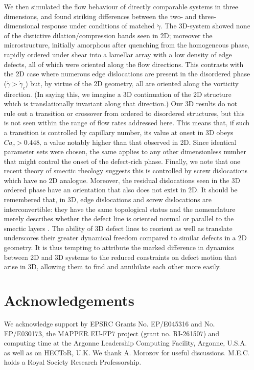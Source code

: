 \documentclass[8.5pt,twoside,twocolumn]{article}
\begin{document}
We then simulated the flow behaviour of directly comparable systems in three dimensions, and found striking differences between the two- and three-dimensional response under conditions of matched $\dot\gamma$. The 3D-system showed none of the distictive dilation/compression bands seen in 2D; moreover the microstructure, initially amorphous after quenching from the homogeneous phase, rapidly ordered under shear into a lamellar array with a low density of edge defects, all of which were oriented along the flow directions. This contrasts with the 2D case where numerous edge dislocations are present in the disordered phase ($\dot\gamma > \dot\gamma_c$) but, by virtue of the 2D geometry, all are oriented along the vorticity direction. (In saying this, we imagine a 3D continuation of the 2D structure which is translationally invariant along that direction.) Our 3D results do not rule out a transition or crossover from ordered to disordered structures, but this is not seen within the range of flow rates addressed here. This means that, if such a transition is controlled by capillary number, its value at onset in 3D obeys $Ca_c>0.448$, a value notably higher than that observed in 2D. Since identical parameter sets were chosen, the same applies to any other dimensionless number that might control the onset of the defect-rich phase. 
Finally, we note that one recent theory of smectic rheology \cite{Lu08} suggests this is controlled by screw dislocations which have no 2D analogue. Moreover, the residual dislocations seen in the 3D ordered phase have an orientation that also does not exist in 2D. It should be remembered that, in 3D, edge dislocations and screw dislocations are interconvertible: they have the same topological status and the nomenclature merely describes whether the defect line is oriented normal or parallel to the smectic layers \cite{ChaikinLubensky}. The ability of 3D defect lines to reorient as well as translate underscores their greater dynamical freedom compared to similar defects in a 2D geometry. It is thus tempting to attribute the marked difference in dynamics between 2D and 3D systems to the reduced constraints on defect motion that arise in 3D, allowing them to find and annihilate each other more easily.



\section{Acknowledgements}
We acknowledge support by EPSRC Grants No. EP/E045316 and No. EP/E030173, the MAPPER EU-FP7 project (grant no. RI-261507) and computing time at the Argonne Leadership Computing Facility, Argonne, U.S.A. as well as on HECToR, U.K.
We thank A. Morozov for useful discussions. 
M.E.C. holds a Royal Society Research Professorship.
\end{document}
